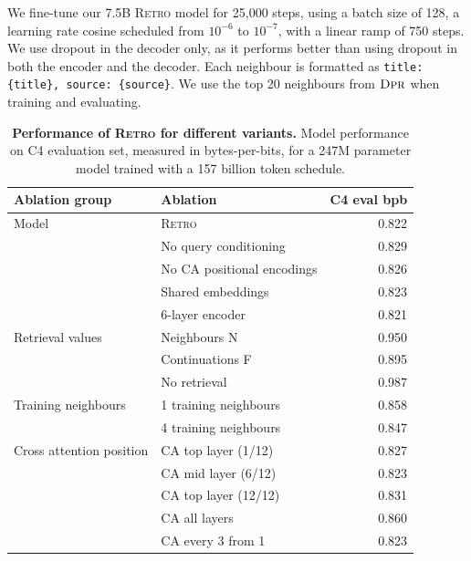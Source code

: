 \documentclass[11pt, a4paper, logo]{deepmind}
\newcommand{\dpr}{\textsc{Dpr}}
\newcommand{\retro}{\textsc{Retro}\xspace}
\begin{document}
We fine-tune our 7.5B \retro model for 25,000 steps, using a batch size of 128, a learning rate cosine scheduled from $10^{-6}$ to $10^{-7}$, with a linear ramp of 750 steps. We use dropout in the decoder only, as it performs better than using dropout in both the encoder and the decoder. Each neighbour is formatted as \texttt{title: \{title\}, source: \{source\}}. We use the top 20 neighbours from $\dpr$ when training and evaluating.


\begin{table}[h]
    \caption{\textbf{Performance of \retro for different variants.} Model performance on C4 evaluation set, measured in bytes-per-bits, for a 247M parameter model trained with a 157 billion token schedule.}
    \label{table:ablation}
\small
    \centering
\begin{tabular}{llr}
\toprule
               Ablation group &                        Ablation &    C4 eval bpb \\
\midrule
                    Model &                      \retro &  0.822 \\
                     &       No query conditioning &  0.829 \\
                     &  No CA positional encodings &  0.826 \\
                     &           Shared embeddings &  0.823 \\
                     &             6-layer encoder &  0.821 \\
\midrule                     
         Retrieval values &                Neighbours N &  0.950 \\
          &             Continuations F &  0.895 \\
          &                No retrieval &  0.987 \\
\midrule
       Training neighbours &       1 training neighbours &  0.858 \\
        &       4 training neighbours &  0.847 \\
\midrule
 Cross attention position &         CA top layer (1/12) &  0.827 \\
  &         CA mid layer (6/12) &  0.823 \\
  &        CA top layer (12/12) &  0.831 \\
  &               CA all layers &  0.860 \\
  &           CA every 3 from 1 &  0.823 \\
\bottomrule
\end{tabular}
\end{table}
\end{document}
